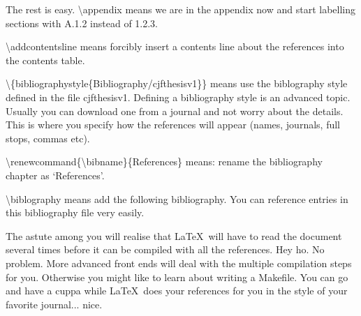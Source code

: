 The rest is easy. {\textbackslash}appendix means we are in the appendix now and start labelling sections with A.1.2 instead of 1.2.3.

{\textbackslash}addcontentsline means forcibly insert a contents line about the references into the contents table.

{\textbackslash}\{bibliographystyle\{Bibliography/cjfthesisv1\}\} means use the biblography style defined in the file cjfthesisv1. Defining a bibliography style is an advanced topic. Usually you can download one from a journal and not worry about the details. This is where you specify how the references will appear (names, journals, full stops, commas etc).

{\textbackslash}renewcommand\{{\textbackslash}bibname\}\{References\} means: rename the bibliography chapter as `References'.

{\textbackslash}biblography means add the following bibliography.  You can reference entries in this bibliography file very easily.

The astute among you will realise that \LaTeX\ will have to read the document several times before it can be compiled with all the references. Hey ho. No problem. More advanced front ends will deal with the multiple compilation steps for you. Otherwise you might like to learn about writing a Makefile. You can go and have a cuppa while \LaTeX\ does your references for you in the style of your favorite journal... nice.



